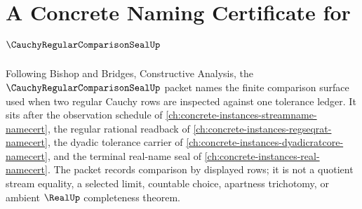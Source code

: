 \chapter{A Concrete Naming Certificate for $\CauchyRegularComparisonSealUp$}
\label{ch:concrete-instances-cauchy-regular-comparison-seal-namecert}

Following Bishop and Bridges, Constructive Analysis, the $\CauchyRegularComparisonSealUp$ packet names the finite comparison surface used when two regular Cauchy rows are inspected against one tolerance ledger. It sits after the observation schedule of \autoref{ch:concrete-instances-streamname-namecert}, the regular rational readback of \autoref{ch:concrete-instances-regseqrat-namecert}, the dyadic tolerance carrier of \autoref{ch:concrete-instances-dyadicratcore-namecert}, and the terminal real-name seal of \autoref{ch:concrete-instances-real-namecert}. The packet records comparison by displayed rows; it is not a quotient stream equality, a selected limit, countable choice, apartness trichotomy, or ambient $\RealUp$ completeness theorem.


